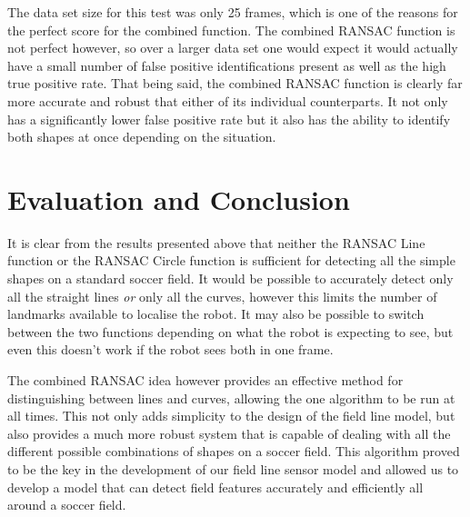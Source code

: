 \documentclass[runningheads,a4paper]{llncs}
\begin{document}
The data set size for this test was only 25 frames, which is one of the reasons for the perfect score for the combined function. The combined RANSAC function is not perfect however, so over a larger data set one would expect it would actually have a small number of false positive identifications present as well as the high true positive rate. That being said, the combined RANSAC function is clearly far more accurate and robust that either of its individual counterparts. It not only has a significantly lower false positive rate but it also has the ability to identify both shapes at once depending on the situation.

\section{Evaluation and Conclusion}
It is clear from the results presented above that neither the RANSAC Line function or the RANSAC Circle function is sufficient for detecting all the simple shapes on a standard soccer field. It would be possible to accurately detect only all the straight lines \emph{or} only all the curves, however this limits the number of landmarks available to localise the robot. It may also be possible to switch between the two functions depending on what the robot is expecting to see, but even this doesn't work if the robot sees both in one frame.

The combined RANSAC idea however provides an effective method for distinguishing between lines and curves, allowing the one algorithm to be run at all times. This not only adds simplicity to the design of the field line model, but also provides a much more robust system that is capable of dealing with all the different possible combinations of shapes on a soccer field. This algorithm proved to be the key in the development of our field line sensor model and allowed us to develop a model that can detect field features accurately and efficiently all around a soccer field.



\end{document}
